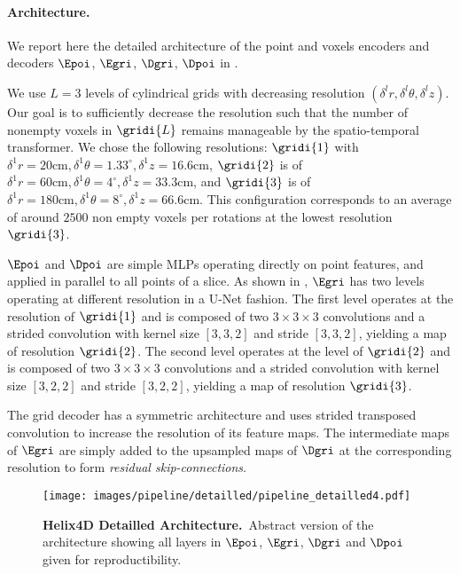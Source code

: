 \documentclass[runningheads]{tpls/llncs}
\begin{document}
\paragraph{Architecture.}
We report here the detailed architecture of the point and voxels encoders and decoders $\Epoi$, $\Egri$, $\Dgri$, $\Dpoi$ in .

We use $L=3$ levels of cylindrical grids with decreasing resolution $(\delta^l r, \delta^l \theta, \delta^l z)$. Our goal is to sufficiently decrease the resolution such that the number of nonempty voxels in $\gridi{L}$ remains manageable by the spatio-temporal transformer. We chose the following resolutions:
$\gridi{1}$ with 
$\delta^1 r = 20\text{cm}, 
\delta^1 \theta=1.33^\circ, 
\delta^1 z= 16.6\text{cm}$,
$\gridi{2}$ is of 
$\delta^1 r = 60\text{cm}, 
\delta^1 \theta=4^\circ, 
\delta^1 z= 33.3\text{cm}$, 
and $\gridi{3}$ is of 
$\delta^1 r = 180\text{cm}, 
\delta^1 \theta=8^\circ, 
\delta^1 z= 66.6\text{cm}$.
This configuration corresponds to an average of around $2500$ non empty voxels per rotations at the lowest resolution $\gridi{3}$.

$\Epoi$ and $\Dpoi$ are simple MLPs operating directly on point features, and applied in parallel to all points of a slice.
As shown in , $\Egri$ has two levels operating at different resolution in a U-Net fashion. The first level operates at the resolution of $\gridi{1}$ and is composed of two $3\times 3 \times 3$ convolutions and a strided convolution
with kernel size $[3,3,2]$ and stride $[3,3,2]$, yielding a map of resolution $\gridi{2}$.
The second level operates at the level of $\gridi{2}$ and is composed of two $3\times 3 \times 3$ convolutions and a strided convolution
with kernel size $[3,2,2]$ and stride $[3,2,2]$, yielding a map of resolution $\gridi{3}$.

The grid decoder has a symmetric architecture and uses strided transposed convolution to increase the resolution of its feature maps. The intermediate maps of $\Egri$  are simply added to the upsampled maps of $\Dgri$ at the corresponding resolution to form \emph{residual skip-connections}. 

\begin{figure*}[h]
    \centering
    \texttt{[image: images/pipeline/detailled/pipeline\_detailled4.pdf]}
    \caption{\textbf{Helix4D Detailled Architecture.}~Abstract version of the architecture showing all layers in $\Epoi$, $\Egri$, $\Dgri$ and $\Dpoi$ given for reproductibility.}
    \label{fig:pipeline_detailled}
\end{figure*}
\end{document}
